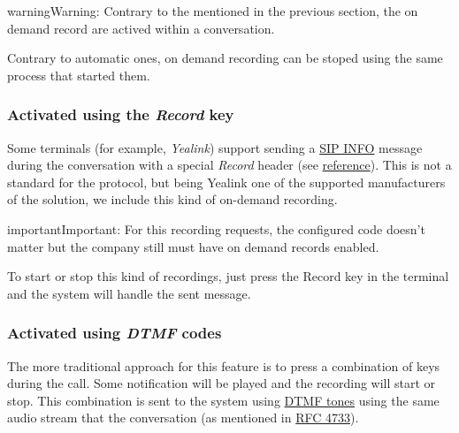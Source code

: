 \documentclass[letterpaper,10pt,english]{sphinxmanual}
\begin{document}
\noindent{}

\begin{notice}{warning}{Warning:}
Contrary to the {\hyperref[pbx_features/services:services]{}} mentioned in the
previous section, the on demand record are actived within a conversation.
\end{notice}

Contrary to automatic ones, on demand recording can be stoped using the same
process that started them.


\subsubsection{Activated using the \emph{Record} key}
\label{pbx_features/call_recording:activated-using-the-record-key}
Some terminals (for example, \emph{Yealink}) support sending a \href{https://tools.ietf.org/html/rfc6086}{SIP INFO} message during the conversation with a
special \emph{Record} header (see \href{http://www.yealink.com/Upload/document/UsingCallRecordingFeatureonYealinkPhones/UsingCallRecordingFeatureonYealinkSIPT2XPphonesRev\_610-20561729764.pdf}{reference}).
This is not a standard for the protocol, but being Yealink one of the supported
manufacturers of the solution, we include this kind of on-demand recording.

\begin{notice}{important}{Important:}
For this recording requests, the configured code doesn't matter
but the company still must have on demand records enabled.
\end{notice}

To start or stop this kind of recordings, just press the Record key in the
terminal and the system will handle the sent message.


\subsubsection{Activated using \emph{DTMF} codes}
\label{pbx_features/call_recording:activated-using-dtmf-codes}
The more traditional approach for this feature is to press a combination of
keys during the call. Some notification will be played and the recording will
start or stop. This combination is sent to the system using \href{https://es.wikipedia.org/wiki/Marcaci\%C3\%B3n\_por\_tonos}{DTMF tones} using the same audio
stream that the conversation (as mentioned in \href{https://tools.ietf.org/html/rfc4733}{RFC 4733}).
\end{document}
